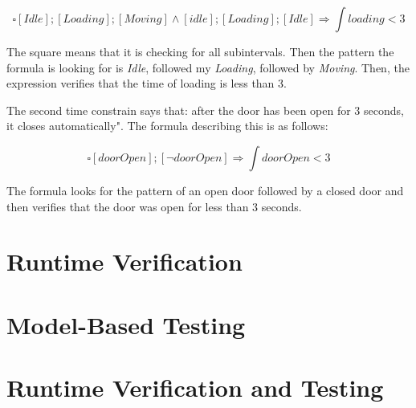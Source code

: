 \documentclass[a4paper, 12pt]{article}
\begin{document}
$$\square [Idle] ; [Loading] ;  [Moving]  \wedge [idle] ; [Loading] ; [Idle] \Rightarrow \int loading < 3$$

The square means that it is checking for all subintervals. Then the pattern the formula is looking for is \textit{Idle}, followed my \textit{Loading}, followed by \textit{Moving}. Then, the expression verifies that the time of loading is less than 3.

The second time constrain says that: after the door has been open for 3 seconds, it closes automatically". The formula describing this is as follows:

$$\square [doorOpen] ; [\neg doorOpen] \Rightarrow \int doorOpen < 3$$

The formula looks for the pattern of an open door followed by a closed door and then verifies that the door was open for less than 3 seconds. 

\section{Runtime Verification}

\section{Model-Based Testing}

\section{Runtime Verification and Testing}


 
\end{document}
